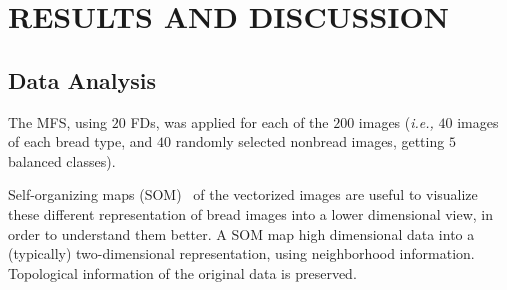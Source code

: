 \documentclass[a4paper,10pt]{article}
\begin{document}
\section{RESULTS AND DISCUSSION}

\subsection{Data Analysis}
The MFS, using $20$ FDs, was applied for each of the $200$ images ({\em i.e.,} $40$ images of each bread type, and $40$ randomly selected nonbread images, getting $5$ balanced classes).

Self-organizing maps (SOM)~\cite{Kohonen2001} of the vectorized images are useful to visualize these different representation of bread images into a lower dimensional view, in order to understand them better. A SOM map high dimensional data into a (typically) two-dimensional representation, using neighborhood information. Topological information of the original data is preserved.  
\end{document}
